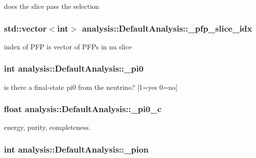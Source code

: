 does the slice pass the selection \hypertarget{classanalysis_1_1DefaultAnalysis_acbf0c279993cbefca72f38bc5e9f6627}{
\subsubsection[{\-\_\-pfp\-\_\-slice\-\_\-idx}]{\setlength{\rightskip}{0pt plus 5cm}std\-::vector$<$int$>$ analysis\-::\-Default\-Analysis\-::\-\_\-pfp\-\_\-slice\-\_\-idx\hspace{0.3cm}{\ttfamily [private]}}}\label{classanalysis_1_1DefaultAnalysis_acbf0c279993cbefca72f38bc5e9f6627}
index of P\-F\-P is vector of P\-F\-Ps in nu slice \hypertarget{classanalysis_1_1DefaultAnalysis_a2a00585c8fd4fcc84f42d50f271ff78a}{
\subsubsection[{\-\_\-pi0}]{\setlength{\rightskip}{0pt plus 5cm}int analysis\-::\-Default\-Analysis\-::\-\_\-pi0\hspace{0.3cm}{\ttfamily [private]}}}\label{classanalysis_1_1DefaultAnalysis_a2a00585c8fd4fcc84f42d50f271ff78a}
is there a final-\/state pi0 from the neutrino? \mbox{[}1=yes 0=no\mbox{]} \hypertarget{classanalysis_1_1DefaultAnalysis_a255069926e7e8a83629b9dac19bf7473}{
\subsubsection[{\-\_\-pi0\-\_\-c}]{\setlength{\rightskip}{0pt plus 5cm}float analysis\-::\-Default\-Analysis\-::\-\_\-pi0\-\_\-c\hspace{0.3cm}{\ttfamily [private]}}}\label{classanalysis_1_1DefaultAnalysis_a255069926e7e8a83629b9dac19bf7473}
energy, purity, completeness. \hypertarget{classanalysis_1_1DefaultAnalysis_ac146d38b0cac5f30ea28c76f21cacdb1}{
\subsubsection[{\-\_\-pion}]{\setlength{\rightskip}{0pt plus 5cm}int analysis\-::\-Default\-Analysis\-::\-\_\-pion\hspace{0.3cm}{\ttfamily [private]}}}\label{classanalysis_1_1DefaultAnalysis_ac146d38b0cac5f30ea28c76f21cacdb1}
